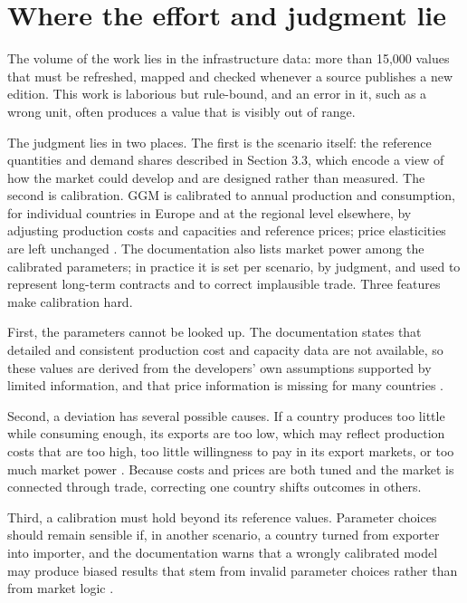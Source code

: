 \section{Where the effort and judgment lie}

The volume of the work lies in the infrastructure data: more than 15,000 values that must be refreshed, mapped and checked whenever a source publishes a new edition.
This work is laborious but rule-bound, and an error in it, such as a wrong unit, often produces a value that is visibly out of range.

The judgment lies in two places.
The first is the scenario itself: the reference quantities and demand shares described in Section 3.3, which encode a view of how the market could develop and are designed rather than measured.
The second is calibration.
GGM is calibrated to annual production and consumption, for individual countries in Europe and at the regional level elsewhere, by adjusting production costs and capacities and reference prices; price elasticities are left unchanged \citep[p.~26]{egging2019global}.
The documentation also lists market power among the calibrated parameters; in practice it is set per scenario, by judgment, and used to represent long-term contracts and to correct implausible trade.
Three features make calibration hard.

First, the parameters cannot be looked up.
The documentation states that detailed and consistent production cost and capacity data are not available, so these values are derived from the developers' own assumptions supported by limited information, and that price information is missing for many countries \citep[pp.~27, 29]{egging2019global}.

Second, a deviation has several possible causes.
If a country produces too little while consuming enough, its exports are too low, which may reflect production costs that are too high, too little willingness to pay in its export markets, or too much market power \citep[p.~26]{egging2019global}.
Because costs and prices are both tuned and the market is connected through trade, correcting one country shifts outcomes in others.

Third, a calibration must hold beyond its reference values.
Parameter choices should remain sensible if, in another scenario, a country turned from exporter into importer, and the documentation warns that a wrongly calibrated model may produce biased results that stem from invalid parameter choices rather than from market logic \citep[p.~26]{egging2019global}.

